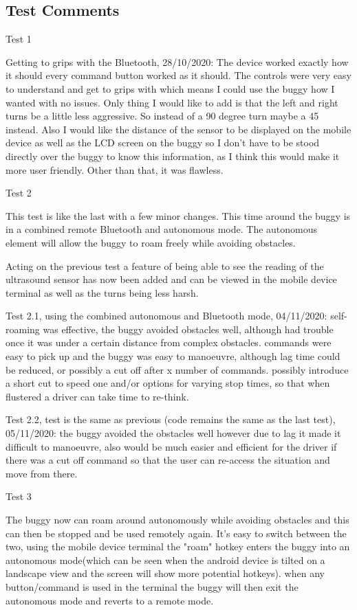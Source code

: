 \documentclass[8pt, a4paper]{article}
\begin{document}
\subsection{Test Comments}
Test 1

Getting to grips with the Bluetooth, 28/10/2020: The device worked exactly how it should every command button worked as it should. The controls were very easy to understand and get to grips with which means I could use the buggy how I wanted with no issues. Only thing I would like to add is that the left and right turns be a little less aggressive. So instead of a 90 degree turn maybe a 45 instead. Also I would like the distance of the sensor to be displayed on the mobile device as well as the LCD screen on the buggy so I don’t have to be stood directly over the buggy to know this information, as I think this would make it more user friendly. Other than that, it was flawless.

Test 2

This test is like the last with a few minor changes. This time around the buggy is in a combined remote Bluetooth and autonomous mode. The autonomous element will allow the buggy to roam freely while avoiding obstacles.

Acting on the previous test a feature of being able to see the reading of the ultrasound sensor has now been added and can be viewed in the mobile device terminal as well as the turns being less harsh.

Test 2.1, using the combined autonomous and Bluetooth mode, 04/11/2020: self-roaming was effective, the buggy avoided obstacles well, although had trouble once it was under a certain distance from complex obstacles. commands were easy to pick up and the buggy was easy to manoeuvre, although lag time could be reduced, or possibly a cut off after x number of commands. possibly introduce a short cut to speed one and/or options for varying stop times, so that when flustered a driver can take time to re-think.

Test 2.2, test is the same as previous (code remains the same as the last test), 05/11/2020: the buggy avoided the obstacles well however due to lag it made it difficult to manoeuvre, also would be much easier and efficient for the driver if there was a cut off command so that the user can re-access the situation and move from there.  

Test 3

The buggy now can roam around autonomously while avoiding obstacles and this can then be stopped and be used remotely again. It’s easy to switch between the two, using the mobile device terminal the "roam" hotkey enters the buggy into an autonomous mode(which can be seen when the android device is tilted on a landscape view and the screen will show more potential hotkeys). when any button/command is used in the terminal the buggy will then exit the autonomous mode and reverts to a remote mode. 
\end{document}
